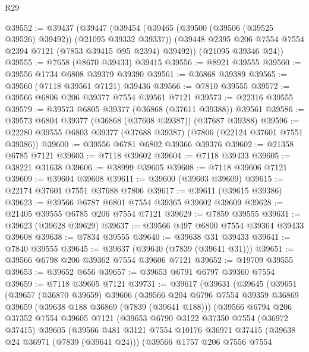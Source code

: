\begin{lexlean}{R29}
\begin{coremodule}
@39552 := @39437
    (@39447
      (@39454
        (@39465 (@39500 (@39506 (@39525 @39526) @39492)) (@21095 @39332 @39337))
        (@39448 @2395 @206 @7554 @7554 @2394 @7121 (@7853 @39415 @95 @2394) @39492))
      (@21095 @39346 @24))
@39555 := @7658 (@8670 @39433) @39415
@39556 := @8921 @39555
@39560 := @39556 @1734 @6808 @39379 @39390
@39561 := @36868 @39389
@39565 := @39560 (@7118 @39561 @7121) @39436
@39566 := @7810 @39555
@39572 := @39566 @6806 @206 @39377 @7554 @39561 @7121
@39573 := @22316 @39555
@39579 := @39573 @6805 @39377 (@36868 (@37611 @39388)) @39561
@39586 := @39573 @6804 @39377 (@36868 (@37608 @39387)) (@37687 @39388)
@39596 := @22280 @39555 @6803 @39377 (@37688 @39387) (@7806 (@22124 @37601 @7551 @39386))
@39600 := @39556 @6781 @6802 @39366 @39376
@39602 := @21358 @6785 @7121
@39603 := @7118 @39602
@39604 := @7118 @39433
@39605 := @38221 @31638
@39606 := @38999 @39605
@39608 := @7118 @39606 @7121
@39609 := @39604 @39608
@39611 := @39600 (@39603 @39609)
@39615 := @22174 @37601 @7551 @37688 @7806
@39617 := @39611 (@39615 @39386)
@39623 := @39566 @6787 @6801 @7554 @39365 @39602 @39609
@39628 := @21405 @39555 @6785 @206 @7554 @7121
@39629 := @7859 @39555
@39631 := @39623 (@39628 @39629)
@39637 := @39566 @497 @6800 @7554 @39364 @39433 @39608
@39638 := @7834 @39555
@39640 := @39638 @31 @39433
@39641 := @7840 @39555
@39645 := @39637 (@39640 (@7839 (@39641 @31)))
@39651 := @39566 @6798 @206 @39362 @7554 @39606 @7121
@39652 := @19709 @39555
@39653 := @39652 @656
@39657 := @39653 @6791 @6797 @39360 @7554
@39659 := @7118 @39605 @7121
@39731 := @39617
    (@39631
      (@39645
        (@39651
          (@39657
            (@36870 @39659)
            @39606
            (@39566
              @204
              @6796
              @7554
              @39359
              @36869
              @39659
              (@39638 @188 @36869 (@7839 (@39641 @188)))
              (@39566
                @6794
                @206
                @37352
                @7554
                @39605
                @7121
                (@39653
                  @6790
                  @3122
                  @37350
                  @7554
                  (@36972 @37415)
                  @39605
                  (@39566
                    @481
                    @3121
                    @7554
                    @10176
                    @36971
                    @37415
                    (@39638 @24 @36971 (@7839 (@39641 @24)))
                    (@39566
                      @1757
                      @206
                      @7556
                      @7554

\end{coremodule}
\end{lexlean}

